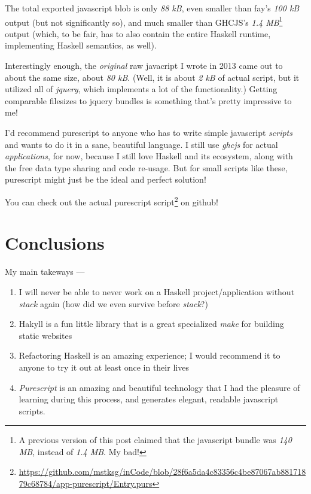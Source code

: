 \documentclass[]{article}
\renewcommand{\href}[2]{#2\footnote{\url{#1}}}
\begin{document}
The total exported javascript blob is only \emph{88 kB}, even smaller than fay's
\emph{100 kB} output (but not significantly so), and much smaller than GHCJS's
\emph{1.4 MB}\footnote{A previous version of this post claimed that the
  javascript bundle was \emph{140 MB}, instead of \emph{1.4 MB}. My bad!} output
(which, to be fair, has to also contain the entire Haskell runtime, implementing
Haskell semantics, as well).

Interestingly enough, the \emph{original} raw javacript I wrote in 2013 came out
to about the same size, about \emph{80 kB}. (Well, it is about \emph{2 kB} of
actual script, but it utilized all of \emph{jquery}, which implements a lot of
the functionality.) Getting comparable filesizes to jquery bundles is something
that's pretty impressive to me!

I'd recommend purescript to anyone who has to write simple javascript
\emph{scripts} and wants to do it in a sane, beautiful language. I still use
\emph{ghcjs} for actual \emph{applications}, for now, because I still love
Haskell and its ecosystem, along with the free data type sharing and code
re-usage. But for small scripts like these, purescript might just be the ideal
and perfect solution!

You can check out
\href{https://github.com/mstksg/inCode/blob/28f6a5da4c83356c4be87067ab88171879c68784/app-purescript/Entry.purs}{the
actual purescript script} on github!

\hypertarget{conclusions}{%
\section{Conclusions}\label{conclusions}}

My main takeways ---

\begin{enumerate}
\def\labelenumi{\arabic{enumi}.}
\tightlist
\item
  I will never be able to never work on a Haskell project/application without
  \emph{stack} again (how did we even survive before \emph{stack}?)
\item
  Hakyll is a fun little library that is a great specialized \emph{make} for
  building static websites
\item
  Refactoring Haskell is an amazing experience; I would recommend it to anyone
  to try it out at least once in their lives
\item
  \emph{Purescript} is an amazing and beautiful technology that I had the
  pleasure of learning during this process, and generates elegant, readable
  javascript scripts.
\end{enumerate}
\end{document}
